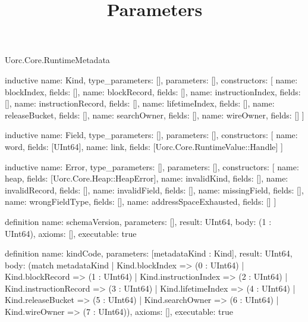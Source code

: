 \begin{lexlean}{Uorc.Core.RuntimeMetadata}
\title{Parameters}
\begin{semanticmodule}
inductive{
  name: Kind,
  type_parameters: [],
  parameters: [],
  constructors: [
    {name: blockIndex, fields: []},
    {name: blockRecord, fields: []},
    {name: instructionIndex, fields: []},
    {name: instructionRecord, fields: []},
    {name: lifetimeIndex, fields: []},
    {name: releaseBucket, fields: []},
    {name: searchOwner, fields: []},
    {name: wireOwner, fields: []}
  ]
}

inductive{
  name: Field,
  type_parameters: [],
  parameters: [],
  constructors: [
    {name: word, fields: [UInt64]},
    {name: link, fields: [Uorc.Core.RuntimeValue::Handle]}
  ]
}

inductive{
  name: Error,
  type_parameters: [],
  parameters: [],
  constructors: [
    {name: heap, fields: [Uorc.Core.Heap::HeapError]},
    {name: invalidKind, fields: []},
    {name: invalidRecord, fields: []},
    {name: invalidField, fields: []},
    {name: missingField, fields: []},
    {name: wrongFieldType, fields: []},
    {name: addressSpaceExhausted, fields: []}
  ]
}

definition{
  name: schemaVersion,
  parameters: [],
  result: UInt64,
  body: (1 : UInt64),
  axioms: [],
  executable: true
}

definition{
  name: kindCode,
  parameters: [metadataKind : Kind],
  result: UInt64,
  body: (match metadataKind
    | Kind.blockIndex => (0 : UInt64)
    | Kind.blockRecord => (1 : UInt64)
    | Kind.instructionIndex => (2 : UInt64)
    | Kind.instructionRecord => (3 : UInt64)
    | Kind.lifetimeIndex => (4 : UInt64)
    | Kind.releaseBucket => (5 : UInt64)
    | Kind.searchOwner => (6 : UInt64)
    | Kind.wireOwner => (7 : UInt64)),
  axioms: [],
  executable: true
}


\end{semanticmodule}
\end{lexlean}
